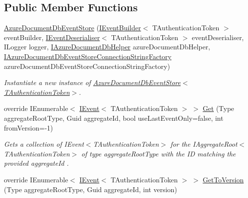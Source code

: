 \subsection*{Public Member Functions}
\begin{DoxyCompactItemize}
\item 
\hyperlink{classCqrs_1_1Azure_1_1DocumentDb_1_1Events_1_1AzureDocumentDbEventStore_a0bbf294600f2dcebfcca28143aacd430_a0bbf294600f2dcebfcca28143aacd430}{Azure\+Document\+Db\+Event\+Store} (\hyperlink{interfaceCqrs_1_1Events_1_1IEventBuilder}{I\+Event\+Builder}$<$ T\+Authentication\+Token $>$ event\+Builder, \hyperlink{interfaceCqrs_1_1Events_1_1IEventDeserialiser}{I\+Event\+Deserialiser}$<$ T\+Authentication\+Token $>$ event\+Deserialiser, I\+Logger logger, \hyperlink{interfaceCqrs_1_1Azure_1_1DocumentDb_1_1IAzureDocumentDbHelper}{I\+Azure\+Document\+Db\+Helper} azure\+Document\+Db\+Helper, \hyperlink{interfaceCqrs_1_1Azure_1_1DocumentDb_1_1Events_1_1IAzureDocumentDbEventStoreConnectionStringFactory}{I\+Azure\+Document\+Db\+Event\+Store\+Connection\+String\+Factory} azure\+Document\+Db\+Event\+Store\+Connection\+String\+Factory)
\begin{DoxyCompactList}\small\item\em Instantiate a new instance of \hyperlink{classCqrs_1_1Azure_1_1DocumentDb_1_1Events_1_1AzureDocumentDbEventStore_a0bbf294600f2dcebfcca28143aacd430_a0bbf294600f2dcebfcca28143aacd430}{Azure\+Document\+Db\+Event\+Store$<$\+T\+Authentication\+Token$>$}. \end{DoxyCompactList}\item 
override I\+Enumerable$<$ \hyperlink{interfaceCqrs_1_1Events_1_1IEvent}{I\+Event}$<$ T\+Authentication\+Token $>$ $>$ \hyperlink{classCqrs_1_1Azure_1_1DocumentDb_1_1Events_1_1AzureDocumentDbEventStore_a54f298fdde141166e23f01e4911bf188_a54f298fdde141166e23f01e4911bf188}{Get} (Type aggregate\+Root\+Type, Guid aggregate\+Id, bool use\+Last\+Event\+Only=false, int from\+Version=-\/1)
\begin{DoxyCompactList}\small\item\em Gets a collection of I\+Event$<$\+T\+Authentication\+Token$>$ for the I\+Aggregate\+Root$<$\+T\+Authentication\+Token$>$ of type {\itshape aggregate\+Root\+Type}  with the ID matching the provided {\itshape aggregate\+Id} . \end{DoxyCompactList}\item 
override I\+Enumerable$<$ \hyperlink{interfaceCqrs_1_1Events_1_1IEvent}{I\+Event}$<$ T\+Authentication\+Token $>$ $>$ \hyperlink{classCqrs_1_1Azure_1_1DocumentDb_1_1Events_1_1AzureDocumentDbEventStore_a749548ae5196022867d32bbb5a8dd277_a749548ae5196022867d32bbb5a8dd277}{Get\+To\+Version} (Type aggregate\+Root\+Type, Guid aggregate\+Id, int version)

\end{DoxyCompactItemize}
